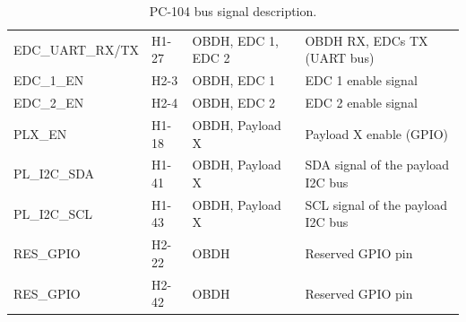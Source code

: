 \begin{table}[!h]
\begin{tabular}{lL{0.2\textwidth}L{0.15\textwidth}L{0.35\textwidth}}
        EDC\_UART\_RX/TX & H1-27           & OBDH, EDC 1, EDC 2   & OBDH RX, EDCs TX (UART bus) \\
        EDC\_1\_EN       & H2-3            & OBDH, EDC 1          & EDC 1 enable signal \\
        EDC\_2\_EN       & H2-4            & OBDH, EDC 2          & EDC 2 enable signal \\
        PLX\_EN          & H1-18           & OBDH, Payload X      & Payload X enable (GPIO) \\
        PL\_I2C\_SDA     & H1-41           & OBDH, Payload X      & SDA signal of the payload I2C bus \\
        PL\_I2C\_SCL     & H1-43           & OBDH, Payload X      & SCL signal of the payload I2C bus \\
        RES\_GPIO        & H2-22           & OBDH                 & Reserved GPIO pin \\
        RES\_GPIO        & H2-42           & OBDH                 & Reserved GPIO pin \\
        \bottomrule[1.5pt]
    \end{tabular}
    \caption{PC-104 bus signal description.}
    \label{tab:pc104-signals}
\end{table}
